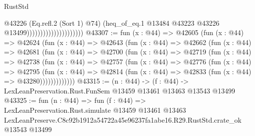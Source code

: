 \begin{lexlean}{RustStd}
\begin{coremodule}
                                            @43226
                                            (Eq.refl.{2} (Sort 1) @74)
                                            (heq_of_eq.{1}
                                              @13484
                                              @43223
                                              @43226
                                              @13499)))))))))))))))))))))
@43307 := fun (x : @44) =>
  @42605
    (fun (x : @44) =>
    @42624
      (fun (x : @44) =>
      @42643
        (fun (x : @44) =>
        @42662
          (fun (x : @44) =>
          @42681
            (fun (x : @44) =>
            @42700
              (fun (x : @44) =>
              @42719
                (fun (x : @44) =>
                @42738
                  (fun (x : @44) =>
                  @42757
                    (fun (x : @44) =>
                    @42776
                      (fun (x : @44) =>
                      @42795
                        (fun (x : @44) =>
                        @42814 (fun (x : @44) => @42833 (fun (x : @44) => @43280)))))))))))))
@43315 := (n : @44) ->
  (f : @44) -> LexLeanPreservation.Rust.FunSem @13459 @13461 @13463 @13543 @13499
@43325 := fun (n : @44) =>
  fun (f : @44) =>
  LexLeanPreservation.Rust.simulate
    @13459
    @13461
    @13463
    LexLeanPreserve.C8c92b1912a54722a45e96237fa1abe16.R29.RustStd.crate_ok
    @13543
    @13499
\end{coremodule}
\end{lexlean}
